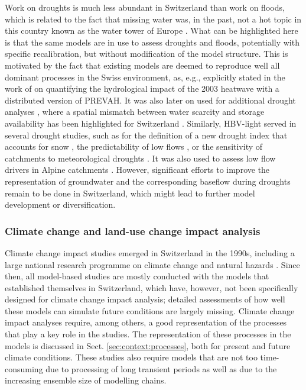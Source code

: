 \documentclass[10pt,a4paper]{article}
\begin{document}
Work on droughts is much less abundant in Switzerland than work on floods, which is related to the fact that missing water was, in the past, not a hot topic in this country known as the water tower of Europe \citep{Milano2015}. What can be highlighted here is that the same models are in use to assess droughts and floods, potentially with specific recalibration, but without modification of the model structure. This is motivated by the fact that existing models are deemed to reproduce well all dominant processes in the Swiss environment, as, e.g., explicitly stated in the work of \citet{Zappa2007a} on quantifying the hydrological impact of the 2003 heatwave with a distributed version of PREVAH. It was also later on used for additional drought analyses \citep{Brunner2019e, Zappa2019}, where a spatial mismatch between water scarcity and storage availability has been highlighted for Switzerland \citep{Brunner2019e}. 
Similarly, HBV-light served in several drought studies, such as for the definition of a new drought index that accounts for snow \citep{Staudinger2014}, the predictability of low flows \citep{Staudinger2014a}, or the sensitivity of catchments to meteorological droughts \citep{Staudinger2015}. It was also used to assess low flow drivers in Alpine catchments \citep{Arnoux2020}. However, significant efforts to improve the representation of groundwater and the corresponding baseflow during droughts remain to be done in Switzerland, which might lead to further model development or diversification.


\subsubsection{Climate change and land-use change impact analysis}
\label{sec:context:climatechange}

Climate change impact studies emerged in Switzerland in the 1990s, including a large national research programme on climate change and natural hazards \citep{SNFS2021}. Since then, all model-based studies are mostly conducted with the models that established themselves in Switzerland, which have, however, not been specifically designed for climate change impact analysis; detailed assessments of how well these models can simulate future conditions are largely missing. Climate change impact analyses require, among others, a good representation of the processes that play a key role in the studies. The representation of these processes in the models is discussed in Sect. \ref{sec:context:processes}, both for present and future climate conditions. These studies also require models that are not too time-consuming due to processing of long transient periods as well as due to the increasing ensemble size of modelling chains.
\end{document}
